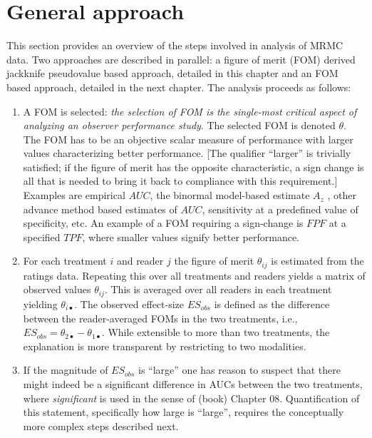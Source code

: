 \documentclass[
]{book}
\providecommand{\tightlist}{%
  \setlength{\itemsep}{0pt}\setlength{\parskip}{0pt}}
\begin{document}
\hypertarget{DBMAnalysisBkgrnd-approach}{%
\section{General approach}\label{DBMAnalysisBkgrnd-approach}}

This section provides an overview of the steps involved in analysis of MRMC data. Two approaches are described in parallel: a figure of merit (FOM) derived jackknife pseudovalue based approach, detailed in this chapter and an FOM based approach, detailed in the next chapter. The analysis proceeds as follows:

\begin{enumerate}
\def\labelenumi{\arabic{enumi}.}
\tightlist
\item
  A FOM is selected: \emph{the selection of FOM is the single-most critical aspect of analyzing an observer performance study}. The selected FOM is denoted \(\theta\). The FOM has to be an objective scalar measure of performance with larger values characterizing better performance. {[}The qualifier ``larger'' is trivially satisfied; if the figure of merit has the opposite characteristic, a sign change is all that is needed to bring it back to compliance with this requirement.{]} Examples are empirical \(AUC\), the binormal model-based estimate \(A_z\) , other advance method based estimates of \(AUC\), sensitivity at a predefined value of specificity, etc. An example of a FOM requiring a sign-change is \(FPF\) at a specified \(TPF\), where smaller values signify better performance.
\item
  For each treatment \(i\) and reader \(j\) the figure of merit \(\theta_{ij}\) is estimated from the ratings data. Repeating this over all treatments and readers yields a matrix of observed values \(\theta_{ij}\). This is averaged over all readers in each treatment yielding \(\theta_{i\bullet}\). The observed effect-size \(ES_{obs}\) is defined as the difference between the reader-averaged FOMs in the two treatments, i.e., \(ES_{obs} = \theta_{2\bullet}-\theta_{1\bullet}\). While extensible to more than two treatments, the explanation is more transparent by restricting to two modalities.
\item
  If the magnitude of \(ES_{obs}\) is ``large'' one has reason to suspect that there might indeed be a significant difference in AUCs between the two treatments, where \emph{significant} is used in the sense of (book) Chapter 08. Quantification of this statement, specifically how large is ``large'', requires the conceptually more complex steps described next.


\end{enumerate}
\end{document}
